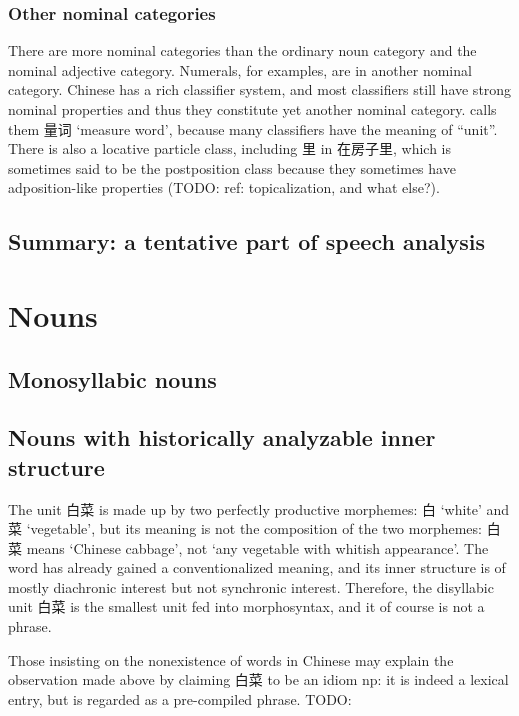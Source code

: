 \documentclass[UTF8, a4paper, oneside, scheme=plain, 12pt]{ctexrep}
\newcommand{\translate}[1]{`#1'}
\begin{document}
\subsubsection{Other nominal categories}

There are more nominal categories than the ordinary noun category and the nominal adjective category.
Numerals, for examples, are in another nominal category.
Chinese has a rich classifier system,
and most classifiers still have strong nominal properties
and thus they constitute yet another nominal category.
\citet{zhudexigrammar} calls them 量词 \translate{measure word},
because many classifiers have the meaning of ``unit''.
There is also a locative particle class, including 里 in 在房子里,
which is sometimes said to be the postposition class
because they sometimes have adposition-like properties (TODO: ref: topicalization, and what else?).


\subsection{Summary: a tentative part of speech analysis}

\section{Nouns}

\subsection{Monosyllabic nouns}

\subsection{Nouns with historically analyzable inner structure}\label{sec:pos.noun.fossilized-structure}

The unit 白菜 is made up by two perfectly productive morphemes:
白 \translate{white} and 菜 \translate{vegetable},
but its meaning is not the composition of the two morphemes:
白菜 means \translate{Chinese cabbage}, not \translate{any vegetable with whitish appearance}.
The word has already gained a conventionalized meaning,
and its inner structure is of mostly diachronic interest but not synchronic interest.
Therefore, the disyllabic unit 白菜 is the smallest unit fed into morphosyntax,
and it of course is not a phrase.

Those insisting on the nonexistence of words in Chinese 
may explain the observation made above 
by claiming 白菜 to be an idiom \ac{np}:
it is indeed a lexical entry,
but is regarded as a pre-compiled phrase. TODO: 
\end{document}
